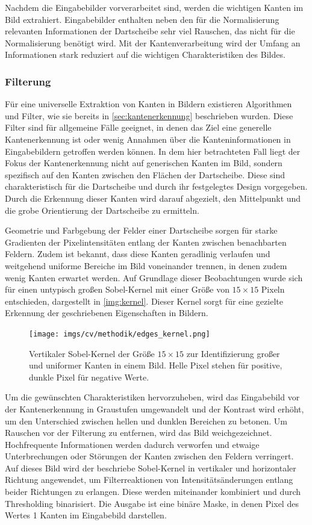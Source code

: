 Nachdem die Eingabebilder vorverarbeitet sind, werden die wichtigen Kanten im Bild extrahiert. Eingabebilder enthalten neben den für die Normalisierung relevanten Informationen der Dartscheibe sehr viel Rauschen, das nicht für die Normalisierung benötigt wird. Mit der Kantenverarbeitung wird der Umfang an Informationen stark reduziert auf die wichtigen Charakteristiken des Bildes.

\subsubsection{Filterung}
\label{sec:filterung}

Für eine universelle Extraktion von Kanten in Bildern existieren Algorithmen und Filter, wie sie bereits in \autoref{sec:kantenerkennung} beschrieben wurden. Diese Filter sind für allgemeine Fälle geeignet, in denen das Ziel eine generelle Kantenerkennung ist oder wenig Annahmen über die Kanteninformationen in Eingabebildern getroffen werden können. In dem hier betrachteten Fall liegt der Fokus der Kantenerkennung nicht auf generischen Kanten im Bild, sondern spezifisch auf den Kanten zwischen den Flächen der Dartscheibe. Diese sind charakteristisch für die Dartscheibe und durch ihr festgelegtes Design vorgegeben. Durch die Erkennung dieser Kanten wird darauf abgezielt, den Mittelpunkt und die grobe Orientierung der Dartscheibe zu ermitteln.

Geometrie und Farbgebung der Felder einer Dartscheibe sorgen für starke Gradienten der Pixelintensitäten entlang der Kanten zwischen benachbarten Feldern. Zudem ist bekannt, dass diese Kanten geradlinig verlaufen und weitgehend uniforme Bereiche im Bild voneinander trennen, in denen zudem wenig Kanten erwartet werden. Auf Grundlage dieser Beobachtungen wurde sich für einen untypisch großen Sobel-Kernel mit einer Größe von $15 \times 15$ Pixeln entschieden, dargestellt in \autoref{img:kernel}. Dieser Kernel sorgt für eine gezielte Erkennung der geschriebenen Eigenschaften in Bildern.

\begin{figure}
    \centering
    \texttt{[image: imgs/cv/methodik/edges\_kernel.png]}
    \caption{Vertikaler Sobel-Kernel der Größe $15\times15$ zur Identifizierung großer und uniformer Kanten in einem Bild. Helle Pixel stehen für positive, dunkle Pixel für negative Werte.}
    \label{img:kernel}
\end{figure}

Um die gewünschten Charakteristiken hervorzuheben, wird das Eingabebild vor der Kantenerkennung in Graustufen umgewandelt und der Kontrast wird erhöht, um den Unterschied zwischen hellen und dunklen Bereichen zu betonen. Um Rauschen vor der Filterung zu entfernen, wird das Bild weichgezeichnet. Hochfrequente Informationen werden dadurch verworfen und etwaige Unterbrechungen oder Störungen der Kanten zwischen den Feldern verringert. Auf dieses Bild wird der beschriebe Sobel-Kernel in vertikaler und horizontaler Richtung angewendet, um Filterreaktionen von Intensitätsänderungen entlang beider Richtungen zu erlangen. Diese werden miteinander kombiniert und durch Thresholding binarisiert. Die Ausgabe ist eine binäre Maske, in denen Pixel des Wertes 1 Kanten im Eingabebild darstellen.

